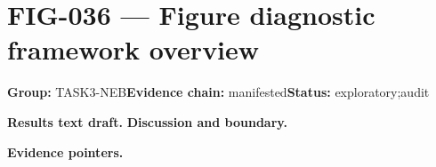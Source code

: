 \clearpage
\section{FIG-036 --- Figure diagnostic framework overview}
\label{figpage:fig-036}
\textbf{Group:} TASK3-NEB\quad \textbf{Evidence chain:} manifested\quad \textbf{Status:} exploratory;audit

\textbf{Results text draft.} 
\textbf{Discussion and boundary.} 


\textbf{Evidence pointers.}



\vfill
